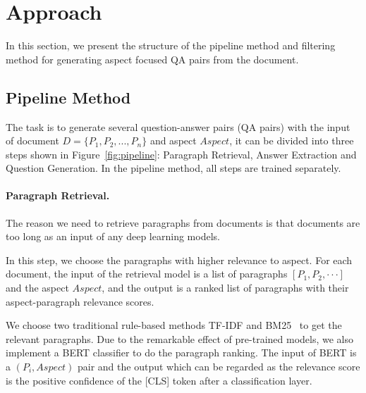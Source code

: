 \section{Approach}
\label{sec:method}

In this section, we present the structure of the pipeline method and filtering method for generating aspect focused QA pairs from the document. 

\subsection{Pipeline Method}
\label{sec:pipeline}
The task is to generate several question-answer pairs (QA pairs) with the input of document $D=\{P_1, P_2, ... , P_n\}$ and aspect $Aspect$, it can be divided into three steps shown in Figure~\ref{fig:pipeline}: Paragraph Retrieval, Answer Extraction and Question Generation. In the pipeline method, all steps are trained separately.
\paragraph{Paragraph Retrieval.} The reason we need to retrieve paragraphs from documents is that documents are too long as an input of any deep learning models. 

In this step, we choose the paragraphs with higher relevance to aspect.
For each document, the input of the retrieval model is a list of paragraphs $[P_1, P_2, \cdot\cdot\cdot]$ and the aspect $Aspect$, and the output is a ranked list of paragraphs with their aspect-paragraph relevance scores.

We choose two traditional rule-based methods TF-IDF and BM25~\cite{robertson2009probabilistic} to get the relevant paragraphs.
Due to the remarkable effect of pre-trained models, we also implement a BERT classifier to do the paragraph ranking\cite{qiao2019understanding}.
The input of BERT is a $(P_i, Aspect)$ pair and the output which can be regarded as the relevance score is the positive confidence of the [CLS] token after a classification layer.

